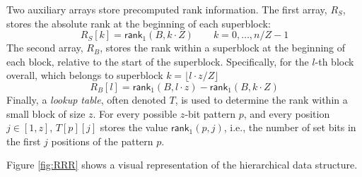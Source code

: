 Two auxiliary arrays store precomputed rank information. The first array, $R_S$, stores the absolute rank at the beginning of each superblock:
\[R_S[k] = \textsf{rank}_1(B, k \cdot Z) \qquad k = 0, \dots, n/Z - 1\]
The second array, $R_B$, stores the rank within a superblock at the beginning of each block, relative to the start of the superblock. Specifically, for the $l$-th block overall, which belongs to superblock $k = \lfloor l \cdot z / Z \rfloor$
\[ R_B[l] = \textsf{rank}_1(B, l \cdot z) - \textsf{rank}_1(B, k \cdot Z)\]
Finally, a \emph{lookup table}, often denoted $T$, is used to determine the rank within a small block of size $z$. For every possible $z$-bit pattern $p$, and every position $j \in [1, z]$, $T[p][j]$ stores the value $\textsf{rank}_1(p, j)$, i.e., the number of set bits in the first $j$ positions of the pattern $p$.

Figure \ref{fig:RRR} shows a visual representation of the hierarchical data structure.

